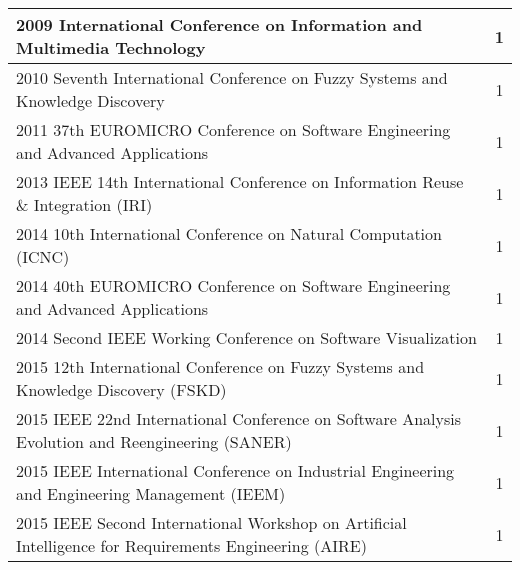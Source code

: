 \begin{longtable}{|p{11cm}|c|}
	2009 International Conference on Information and Multimedia Technology                                                                                                                  & 1        \\ \hline
	2010 Seventh International Conference on Fuzzy Systems and Knowledge Discovery                                                                                                          & 1        \\ \hline
	2011 37th EUROMICRO Conference on Software Engineering and Advanced Applications                                                                                                        & 1        \\ \hline
	2013 IEEE 14th International Conference on Information Reuse \& Integration (IRI)                                                                                                       & 1        \\ \hline
	2014 10th International Conference on Natural Computation (ICNC)                                                                                                                        & 1        \\ \hline
	2014 40th EUROMICRO Conference on Software Engineering and Advanced Applications                                                                                                        & 1        \\ \hline
	2014 Second IEEE Working Conference on Software Visualization                                                                                                                           & 1        \\ \hline
	2015 12th International Conference on Fuzzy Systems and Knowledge Discovery (FSKD)                                                                                                      & 1        \\ \hline
	2015 IEEE 22nd International Conference on Software Analysis Evolution and Reengineering (SANER)                                                                                        & 1        \\ \hline
	2015 IEEE International Conference on Industrial Engineering and Engineering Management (IEEM)                                                                                          & 1        \\ \hline
	2015 IEEE Second International Workshop on Artificial Intelligence for Requirements Engineering (AIRE)                                                                                  & 1        \\ \hline

\end{longtable}
